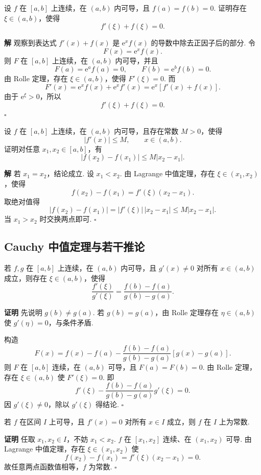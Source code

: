 \documentclass[fontset=fandol]{ctexart}
\newenvironment{proofdetail}{\par\noindent\textbf{证明}\quad}{\hfill$\square$\par\vspace{0.8em}}
\newenvironment{solution}{\par\noindent\textbf{解}\quad}{\hfill$\square$\par\vspace{0.8em}}
\newcommand{\ee}{\mathrm{e}}
\begin{document}
\begin{example}[构造辅助函数]
设 $f$ 在 $[a,b]$ 上连续，在 $(a,b)$ 内可导，且 $f(a)=f(b)=0$. 证明存在 $\xi\in(a,b)$，使得
\[
f'(\xi)+f(\xi)=0.
\]
\end{example}
\begin{solution}
观察到表达式 $f'(x)+f(x)$ 是 $\ee^x f(x)$ 的导数中除去正因子后的部分. 令
\[
F(x)=\ee^x f(x).
\]
则 $F$ 在 $[a,b]$ 上连续，在 $(a,b)$ 内可导，并且
\[
F(a)=\ee^a f(a)=0,\qquad F(b)=\ee^b f(b)=0.
\]
由 Rolle 定理，存在 $\xi\in(a,b)$，使得 $F'(\xi)=0$. 而
\[
F'(x)=\ee^x f(x)+\ee^x f'(x)=\ee^x[f'(x)+f(x)].
\]
由于 $\ee^\xi>0$，所以
\[
f'(\xi)+f(\xi)=0.
\]
\end{solution}

\begin{example}[由导数界估计函数增量]
设 $f$ 在 $[a,b]$ 上连续，在 $(a,b)$ 内可导，且存在常数 $M>0$，使得
\[
|f'(x)|\leq M,\qquad x\in(a,b).
\]
证明对任意 $x_1,x_2\in[a,b]$，有
\[
|f(x_2)-f(x_1)|\leq M|x_2-x_1|.
\]
\end{example}
\begin{solution}
若 $x_1=x_2$，结论成立. 设 $x_1<x_2$. 由 Lagrange 中值定理，存在 $\xi\in(x_1,x_2)$，使得
\[
f(x_2)-f(x_1)=f'(\xi)(x_2-x_1).
\]
取绝对值得
\[
|f(x_2)-f(x_1)|=|f'(\xi)|\,|x_2-x_1|\leq M|x_2-x_1|.
\]
当 $x_1>x_2$ 时交换两点即可.
\end{solution}

\subsection{Cauchy 中值定理与若干推论}

\begin{theorem}
若 $f,g$ 在 $[a,b]$ 上连续，在 $(a,b)$ 内可导，且 $g'(x)\neq0$ 对所有 $x\in(a,b)$ 成立，则存在 $\xi\in(a,b)$，使得
\[
\frac{f'(\xi)}{g'(\xi)}=\frac{f(b)-f(a)}{g(b)-g(a)}.
\]
\end{theorem}
\begin{proofdetail}
先说明 $g(b)\neq g(a)$. 若 $g(b)=g(a)$，由 Rolle 定理存在 $\eta\in(a,b)$ 使 $g'(\eta)=0$，与条件矛盾.

构造
\[
F(x)=f(x)-f(a)-\frac{f(b)-f(a)}{g(b)-g(a)}[g(x)-g(a)].
\]
则 $F$ 在 $[a,b]$ 连续，在 $(a,b)$ 可导，且 $F(a)=F(b)=0$. 由 Rolle 定理，存在 $\xi\in(a,b)$ 使 $F'(\xi)=0$. 即
\[
f'(\xi)-\frac{f(b)-f(a)}{g(b)-g(a)}g'(\xi)=0.
\]
因 $g'(\xi)\neq0$，除以 $g'(\xi)$ 得结论.
\end{proofdetail}

\begin{proposition}[导数恒为零的函数为常数]
若 $f$ 在区间 $I$ 上可导，且 $f'(x)=0$ 对所有 $x\in I$ 成立，则 $f$ 在 $I$ 上为常数.
\end{proposition}
\begin{proofdetail}
任取 $x_1,x_2\in I$，不妨 $x_1<x_2$. $f$ 在 $[x_1,x_2]$ 连续、在 $(x_1,x_2)$ 可导. 由 Lagrange 中值定理，存在 $\xi\in(x_1,x_2)$ 使
\[
f(x_2)-f(x_1)=f'(\xi)(x_2-x_1)=0.
\]
故任意两点函数值相等，$f$ 为常数.
\end{proofdetail}
\end{document}
